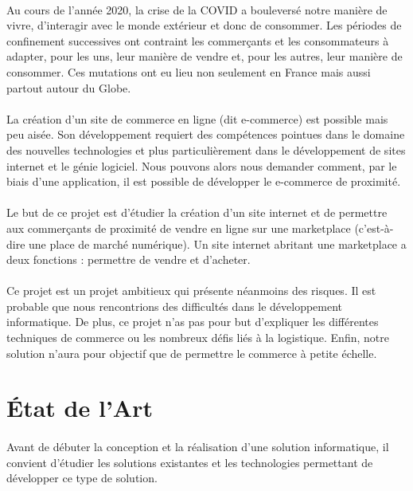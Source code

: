 \documentclass[a4paper, 12pt]{article}
\begin{document}
\paragraph{}Au cours de l’année 2020, la crise de la COVID a bouleversé notre manière de vivre, d'interagir avec le monde extérieur et donc de consommer. Les périodes de confinement successives ont contraint les commerçants et les consommateurs à adapter, pour les uns, leur manière de vendre et, pour les autres, leur manière de consommer. Ces mutations ont eu lieu non seulement en France mais aussi partout autour du Globe.
\paragraph{}La création d’un site de commerce en ligne (dit e-commerce) est possible mais peu aisée. Son développement requiert des compétences pointues dans le domaine des nouvelles technologies et plus particulièrement dans le développement de sites internet et le génie logiciel. Nous pouvons alors nous demander comment, par le biais d’une application, il est possible de développer le e-commerce de proximité.
\paragraph{}Le but de ce projet est d’étudier la création d’un site internet et de permettre aux commerçants de proximité de vendre en ligne sur une marketplace (c’est-à-dire une place de marché numérique). Un site internet abritant une marketplace a deux fonctions : permettre de vendre et d’acheter.
\paragraph{}Ce projet est un projet ambitieux qui présente néanmoins des risques. Il est probable que nous rencontrions des difficultés dans le développement informatique. De plus, ce projet n’as pas pour but d’expliquer les différentes techniques de commerce ou les nombreux défis liés à la logistique. Enfin, notre solution n’aura pour objectif que de permettre le commerce à petite échelle.

\newpage
\section{État de l'Art}
\paragraph{}Avant de débuter la conception et la réalisation d'une solution informatique, il convient d'étudier les solutions existantes et les technologies permettant de développer ce type de solution.
\end{document}
